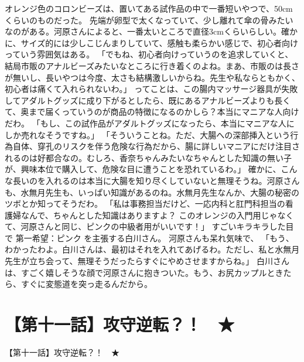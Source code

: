 オレンジ色のコロンビーズは、置いてある試作品の中で一番短いやつで、50cmくらいのものだった。
先端が卵型で太くなっていて、少し離れて傘の骨みたいなのがある。河原さんによると、一番太いところで直径3cmくらいらしい。確かに、サイズ的には少しこじんまりしていて、感触も柔らかい感じで、初心者向けっていう雰囲気はある。
「でもね、初心者向けっていうのを追求していくと、結局市販のアナルビーズみたいなところに行き着くのよね。まあ、市販のは長さが無いし、長いやつは今度、太さも結構激しいからね。先生や私ならともかく、初心者は痛くて入れられないわ。」
ってことは、この腸内マッサージ器具が失敗してアダルトグッズに成り下がるとしたら、既にあるアナルビーズよりも長くて、奥まで届くっていうのが商品の特徴になるのかしら？本当にマニアな人向けだわ。
「もし、この試作品がアダルトグッズになったら、本当にマニアな人にしか売れなそうですね。」
「そういうことね。ただ、大腸への深部挿入という行為自体、穿孔のリスクを伴う危険な行為だから、腸に詳しいマニアにだけ注目されるのは好都合なの。むしろ、香奈ちゃんみたいなちゃんとした知識の無い子が、興味本位で購入して、危険な目に遭うことを恐れているわ。」
確かに、こんな長いのを入れるのは本当に大腸を知り尽くしていないと無理そうね。河原さんも、水無月先生も、いっぱい知識があるのね。水無月先生なんか、大腸の秘密のツボとか知ってそうだわ。
「私は事務担当だけど、一応内科と肛門科担当の看護婦なんで、ちゃんとした知識はありますよ？ このオレンジの入門用じゃなくて、河原さんと同じ、ピンクの中級者用がいいです！」
すごいキラキラした目で 第一希望：ピンク を主張する白川さん。
河原さんも呆れ気味で、
「もう、わかったわよ。白川さんは、最初はそれを入れてあげるわ。ただし、私と水無月先生が立ち会って、無理そうだったらすぐにやめさせますからね。」
白川さんは、すごく嬉しそうな顔で河原さんに抱きついた。もう、お尻カップルときたら、すぐに変態道を突っ走るんだから。


\section{【第十一話】攻守逆転？！　★}
【第十一話】攻守逆転？！　★


